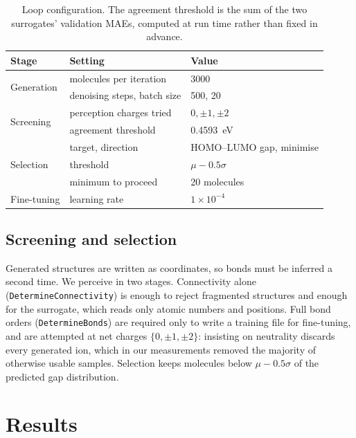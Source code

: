 \documentclass[runningheads]{llncs}
\begin{document}
\begin{table}[t]
\centering
\caption{Loop configuration. The agreement threshold is the sum of the
two surrogates' validation MAEs, computed at run time rather than fixed
in advance.}
\label{tab:config}
\begin{tabular}{lll}
\toprule
Stage & Setting & Value \\
\midrule
\multirow{2}{*}{Generation}
 & molecules per iteration        & \num{3000} \\
 & denoising steps, batch size    & \num{500}, \num{20} \\
\midrule
\multirow{2}{*}{Screening}
 & perception charges tried       & $0,\pm1,\pm2$ \\
 & agreement threshold            & \SI{0.4593}{\electronvolt} \\
\midrule
\multirow{3}{*}{Selection}
 & target, direction              & HOMO--LUMO gap, minimise \\
 & threshold                      & $\mu-0.5\sigma$ \\
 & minimum to proceed             & \num{20} molecules \\
\midrule
Fine-tuning
 & learning rate                  & $1\times10^{-4}$ \\
\bottomrule
\end{tabular}
\end{table}

\subsection{Screening and selection}

Generated structures are written as coordinates, so bonds must be
inferred a second time. We perceive in two stages. Connectivity alone
(\texttt{DetermineConnectivity}) is enough to reject fragmented
structures and enough for the surrogate, which reads only atomic
numbers and positions. Full bond orders
(\texttt{DetermineBonds}) are required only to write a training file for
fine-tuning, and are attempted at net charges
$\{0,\pm1,\pm2\}$: insisting on neutrality discards every generated ion,
which in our measurements removed the majority of otherwise usable
samples. Selection keeps molecules below $\mu - 0.5\sigma$ of the
predicted gap distribution.

\section{Results}
\end{document}
